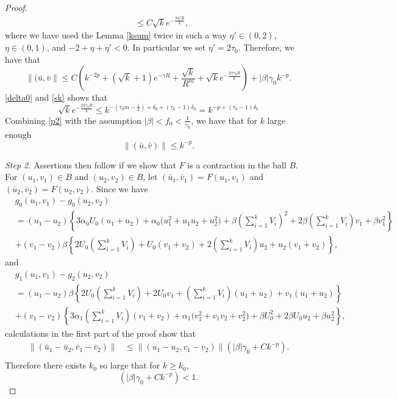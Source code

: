 \documentclass{amsart}
\theoremstyle{definition}
\theoremstyle{remark}
\numberwithin{equation}{section}
\begin{document}
\begin{proof}
\begin{equation}
\begin{aligned}
 & \le C \sqrt{k}e^{-\frac{\pi\eta' R}{k}},
 \end{aligned}\end{equation}
 where we have used the Lemma \ref{ksum} twice in such a way $\eta'\in (0,2)$, $\eta\in (0,1)$, and $-2 +\eta + \eta' < 0$. In particular we set $\eta'= 2\tau_0$. %
Therefore, we have that
\begin{equation} \label{p2}
 \|(\bar u,\bar v\| \le C\left( k^{-2p} + (\sqrt{k}+1)e^{-\gamma R} + \frac{\sqrt{k}}{R^m} + \sqrt{k}e^{-\frac{2\pi\tau_0 R}{k}} \right) + |\beta|\gamma_0k^{-p}.
\end{equation}
\eqref{delta0} and \eqref{sk} shows that
$$ \sqrt{k}e^{-\frac{2\pi\tau_0 R}{k}} \le k^{-\left(\tau_0m - \frac{1}{2}\right) + \delta_0 + (\tau_0-1)\delta_0} = k^{-p + (\tau_0-1)\delta_0}$$
Combining \eqref{p2} with the assumption $|\beta|< f_0<\frac{1}{\gamma_0}$, we have
that for $k$ large enough $$\|(\bar u,\bar v)\| \le k^{-p}.$$


\textit{Step 2.} Assertions then follow if we show that $F$ is a contraction in the ball $B$. For $(u_1,v_1)\in B$ and $(u_2,v_2) \in B$, let $(\bar{u}_1, \bar{v}_1) = F(u_1,v_1)$ and $(\bar{u}_2, \bar{v}_2) = F(u_2,v_2)$. Since we have 
\begin{align*}
&g_0(u_1,v_1) - g_0(u_2,v_2)\\
&= {(u_1 - u_2)}\left\{ 3\alpha_0U_0(u_1+u_2) + \alpha_0\big(u_1^2+u_1u_2 + u_2^2\big) + \beta \left(\sum_{i=1}^k V_{i}\right)^2 + 2\beta \left(\sum_{i=1}^k V_{i}\right) v_1 + \beta v_1^2\right\}\\
&+  {(v_1-v_2)}\beta\left\{ 2U_0 \left(\sum_{i=1}^k V_{i}\right) + U_0(v_1+v_2) + 2\left( \sum_{i=1}^k V_{i}\right)u_2 + u_2(v_1+v_2)\right\},\end{align*}and
\begin{align*}
&g_1(u_1,v_1) - g_2(u_2,v_2)\\
&= {(u_1 - u_2)}\beta\left\{ 2U_0\left(\sum_{i=1}^k V_{i}\right) + 2U_0v_1 + \left(\sum_{i=1}^k V_{i}\right)(u_1+u_2) +v_1(u_1+u_2)\right\}\\
&+  {(v_1-v_2)}\left\{ 3\alpha_1\left(\sum_{i=1}^k V_{i}\right)(v_1+v_2) + \alpha_1\big(v_1^2 + v_1v_2 + v_2^2\big) + \beta U_0^2 + 2\beta U_0u_2 + \beta u_2^2\right\},
\end{align*}
calculations in the first part of the proof show that
\begin{align*}
 \|(\bar{u}_1 - \bar{u}_2, \bar{v}_1 - \bar{v}_2)\| &\le \|(u_1 - u_2,v_1-v_2)\| \left( |\beta|\gamma_0 + Ck^{-p}\right). \\
\end{align*}
Therefore there exists $k_0$ so large that for $k \ge k_0$, $$\left( |\beta|\gamma_0 + Ck^{-p}\right) < 1.$$
\end{proof}
\end{document}
